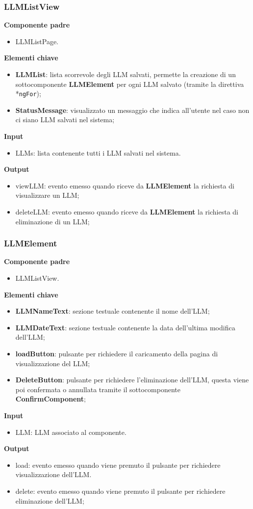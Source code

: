 \subsubsection{LLMListView}
\textbf{Componente padre}
\begin{itemize}
    \item LLMListPage.
\end{itemize}
\textbf{Elementi chiave}
\begin{itemize}
    \item \textbf{LLMList}: lista scorrevole degli LLM salvati, permette la creazione di un sottocomponente \textbf{LLMElement} per ogni LLM salvato (tramite la direttiva *\texttt{ngFor});
    \item \textbf{StatusMessage}: visualizzato un messaggio che indica all'utente nel caso non ci siano LLM salvati nel sistema;
\end{itemize}
\textbf{Input}
\begin{itemize}
    \item LLMs: lista contenente tutti i LLM salvati nel sistema.
\end{itemize}
\textbf{Output}
\begin{itemize}
    \item viewLLM: evento emesso quando riceve da \textbf{LLMElement} la richiesta di visualizzare un LLM;
    \item deleteLLM: evento emesso quando riceve da \textbf{LLMElement} la richiesta di eliminazione di un LLM;
\end{itemize}
\subsubsection{LLMElement}
\textbf{Componente padre}
\begin{itemize}
    \item LLMListView.
\end{itemize}
\textbf{Elementi chiave}
\begin{itemize}
    \item \textbf{LLMNameText}: sezione testuale contenente il nome dell'LLM;
    \item \textbf{LLMDateText}: sezione testuale contenente la data dell'ultima modifica dell'LLM;
    \item \textbf{loadButton}: pulsante per richiedere il caricamento della pagina di visualizzazione del LLM;
    \item \textbf{DeleteButton}: pulsante per richiedere l'eliminazione dell'LLM, questa viene poi confermata o annullata tramite il sottocomponente \textbf{ConfirmComponent};
\end{itemize}
\textbf{Input}
\begin{itemize}
    \item LLM: LLM associato al componente.
\end{itemize}
\textbf{Output}
\begin{itemize}
    \item load: evento emesso quando viene premuto il pulsante per richiedere visualizzazione dell'LLM.
    \item delete: evento emesso quando viene premuto il pulsante per richiedere eliminazione dell'LLM;
\end{itemize}
